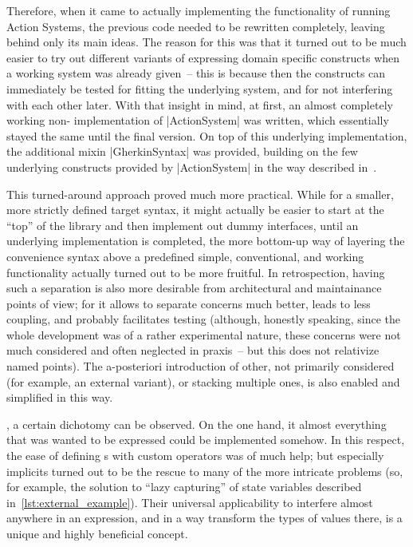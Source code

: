 Therefore, when it came to actually implementing the functionality of running Action Systems, the
previous code needed to be rewritten completely, leaving behind only its main ideas. The reason for
this was that it turned out to be much easier to try out different variants of expressing domain
specific constructs when a working system was already given~-- this is because then the constructs
can immediately be tested for fitting the underlying system, and for not interfering with each other
later. With that insight in mind, at first, an almost completely working non-\dsl{} implementation
of |ActionSystem| was written, which essentially stayed the same until the final version. On top of
this underlying implementation, the additional mixin |GherkinSyntax| was provided, building on the
few underlying constructs provided by |ActionSystem| in the way described
in~.

This turned-around approach proved much more practical. While for a smaller, more strictly defined
target \dsl{} syntax, it might actually be easier to start at the \enquote{top} of the library and
then implement out dummy interfaces, until an underlying implementation is completed, the more
bottom-up way of layering the convenience syntax above a predefined simple, conventional, and
working functionality actually turned out to be more fruitful. In retrospection, having such a
separation is also more desirable from architectural and maintainance points of view; for it allows
to separate concerns much better, leads to less coupling, and probably facilitates testing
(although, honestly speaking, since the whole development was of a rather experimental nature, these
concerns were not much considered and often neglected in praxis~-- but this does not relativize named
points). The a-posteriori introduction of other, not primarily considered \dsls{} (for example, an
external variant), or stacking multiple ones, is also enabled and simplified in this way.

, a certain dichotomy can be observed. On
the one hand, it almost everything that was wanted to be expressed could be implemented somehow. In
this respect, the ease of defining s with custom operators was of much help; but
especially implicits turned out to be the rescue to many of the more intricate problems (so, for
example, the solution to \enquote{lazy capturing} of state variables described
in~\autoref{lst:external_example}). Their universal applicability to interfere almost anywhere in an
expression, and in a way transform the types of values there, is a unique and highly beneficial
concept.

